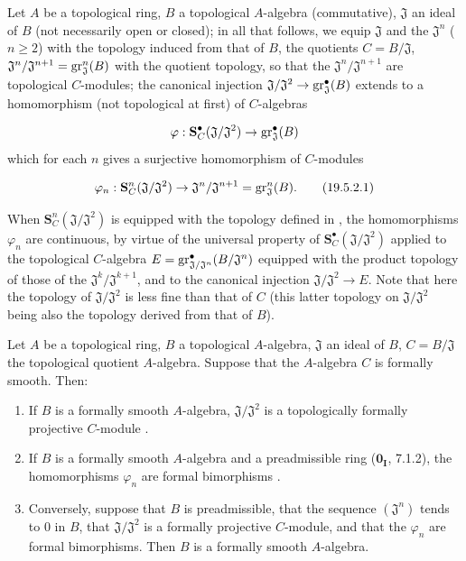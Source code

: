\begin{env}[19.5.2]
\label{0.19.5.2}
Let $A$ be a topological ring, $B$ a topological $A$-algebra (commutative), $\mathfrak{J}$ an ideal of $B$ (not necessarily open or closed);
in all that follows, we equip $\mathfrak{J}$ and the $\mathfrak{J}^n$ ($n\geq 2$) with the topology induced from that of $B$, the quotients $C=B/\mathfrak{J}$, $\mathfrak{J}^n/\mathfrak{J}^{n+1}=\operatorname{gr}_\mathfrak{J}^n(B)$ with the quotient topology, so that the $\mathfrak{J}^n/\mathfrak{J}^{n+1}$ are topological $C$-modules;
the canonical injection $\mathfrak{J}/\mathfrak{J}^2\to\operatorname{gr}_\mathfrak{J}^\bullet(B)$ extends to a homomorphism (not topological at first) of $C$-algebras

\[
\varphi:\mathbf{S}_C^\bullet(\mathfrak{J}/\mathfrak{J}^2) \to \operatorname{gr}_\mathfrak{J}^\bullet(B)
\]
which for each $n$ gives a surjective homomorphism of $C$-modules

\[
\varphi_n:\mathbf{S}_C^n(\mathfrak{J}/\mathfrak{J}^2) \to \mathfrak{J}^n/\mathfrak{J}^{n+1}=\operatorname{gr}_\mathfrak{J}^n(B). \tag{19.5.2.1}
\]


When $\mathbf{S}_C^n(\mathfrak{J}/\mathfrak{J}^2)$ is equipped with the topology defined in , the homomorphisms $\varphi_n$ are continuous, by virtue of the universal property  of $\mathbf{S}_C^\bullet(\mathfrak{J}/\mathfrak{J}^2)$
applied to the topological $C$-algebra $E=\operatorname{gr}^\bullet_{\mathfrak{J}/\mathfrak{J}^n}(B/\mathfrak{J}^n)$ equipped with the product topology of those of the $\mathfrak{J}^k/\mathfrak{J}^{k+1}$, and to the canonical injection $\mathfrak{J}/\mathfrak{J}^2\to E$.
Note that here the topology of $\mathfrak{J}/\mathfrak{J}^2$ is less fine than that of $C$ (this latter topology on $\mathfrak{J}/\mathfrak{J}^2$ being also the topology derived from that of $B$).
\end{env}

\begin{theorem}[19.5.3]
\label{0.19.5.3}
Let $A$ be a topological ring, $B$ a topological $A$-algebra, $\mathfrak{J}$ an ideal of $B$, $C=B/\mathfrak{J}$ the topological quotient $A$-algebra.
Suppose that the $A$-algebra $C$ is formally smooth.
Then:
\begin{enumerate}
  \item[\rm(i)] If $B$ is a formally smooth $A$-algebra, $\mathfrak{J}/\mathfrak{J}^2$ is a topologically formally projective $C$-module .
  \item[\rm(ii)] If $B$ is a formally smooth $A$-algebra and a preadmissible ring ($\mathbf{0_I}$, 7.1.2), the homomorphisms $\varphi_n$  are formal bimorphisms .
  \item[\rm(iii)] Conversely, suppose that $B$ is preadmissible, that the sequence $(\mathfrak{J}^n)$ tends to $0$ in $B$, that $\mathfrak{J}/\mathfrak{J}^2$ is a formally projective $C$-module, and that the $\varphi_n$ are formal bimorphisms. Then $B$ is a formally smooth $A$-algebra.
\end{enumerate}
\end{theorem}

